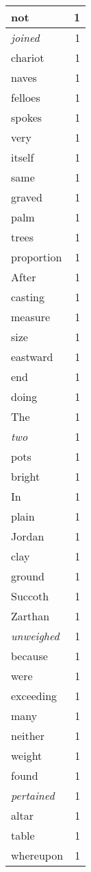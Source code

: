 \begin{center}
\begin{longtable}{l|r}
not & 1 \\ \hline
\emph{joined} & 1 \\ \hline
chariot & 1 \\ \hline
naves & 1 \\ \hline
felloes & 1 \\ \hline
spokes & 1 \\ \hline
very & 1 \\ \hline
itself & 1 \\ \hline
same & 1 \\ \hline
graved & 1 \\ \hline
palm & 1 \\ \hline
trees & 1 \\ \hline
proportion & 1 \\ \hline
After & 1 \\ \hline
casting & 1 \\ \hline
measure & 1 \\ \hline
size & 1 \\ \hline
eastward & 1 \\ \hline
end & 1 \\ \hline
doing & 1 \\ \hline
The & 1 \\ \hline
\emph{two} & 1 \\ \hline
pots & 1 \\ \hline
bright & 1 \\ \hline
In & 1 \\ \hline
plain & 1 \\ \hline
Jordan & 1 \\ \hline
clay & 1 \\ \hline
ground & 1 \\ \hline
Succoth & 1 \\ \hline
Zarthan & 1 \\ \hline
\emph{unweighed} & 1 \\ \hline
because & 1 \\ \hline
were & 1 \\ \hline
exceeding & 1 \\ \hline
many & 1 \\ \hline
neither & 1 \\ \hline
weight & 1 \\ \hline
found & 1 \\ \hline
\emph{pertained} & 1 \\ \hline
altar & 1 \\ \hline
table & 1 \\ \hline
whereupon & 1 \\ \hline

\end{longtable}
\end{center}
